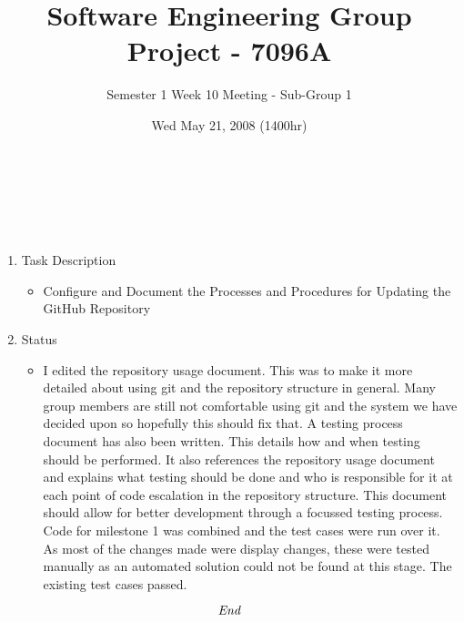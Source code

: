 \documentclass[10pt, a4]{article}
\begin{document}
\title{Software Engineering Group Project - 7096A}
\author{Semester 1 Week 10 Meeting - Sub-Group 1}
\date{Wed May 21, 2008 (1400hr)}

\maketitle 

\\
\\
\\
\begin{enumerate}
\item {Task Description}
  \begin{itemize}
  \item Configure and Document the Processes and Procedures for Updating the GitHub Repository
  \end{itemize}
\item {Status}
  \begin{itemize}
  \item I edited the repository usage document. This was to make it more detailed about using git and the repository structure in general. Many group members are still not comfortable using git and the system we have decided upon so hopefully this should fix that. A testing process document has also been written. This details how and when testing should be performed. It also references the repository usage document and explains what testing should be done and who is responsible for it at each point of code escalation in the repository structure. This document should allow for better development through a focussed testing process. Code for milestone 1 was combined and the test cases were run over it. As most of the changes made were display changes, these were tested manually as an automated solution could not be found at this stage. The existing test cases passed. 
  \end{itemize}
\end{enumerate}

\[\emph{End}\]
\end{document}
